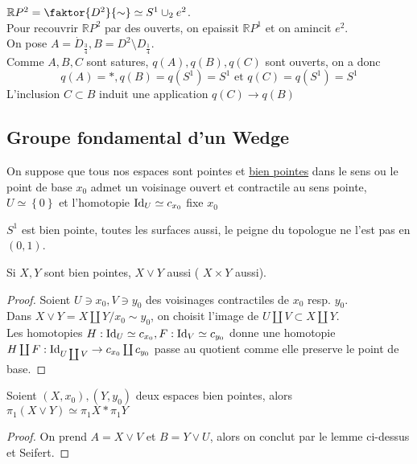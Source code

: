 \documentclass[../main.tex]{subfiles}
\begin{document}
\begin{exemple}
$ \mathbb{R}P^{2} = \faktor { D^{2}} { \sim} \simeq S^{1}\cup_2 e^{2}$.\\
Pour recouvrir $ \mathbb{R}P^{2}$ par des ouverts, on epaissit $ \mathbb{R}P^{1}$ et on amincit $ e^{2}$.\\
On pose $ A =  \dot{ D }_{\frac{3}{4}} , B = D^{2}\setminus D_{\frac{1}{4}} $.\\
Comme $A,B,C$ sont satures, $q( A) ,q( B) , q( C) $ sont ouverts, on a donc
\[ 
q( A) = \ast, q( B) = q( S^{1}) = S^{1} \text{ et } q( C) = q( S^{1}) = S^{1}
\]
L'inclusion $C \subset B$ induit une application $q( C) \to q( B) $ 
\end{exemple}
\subsection{Groupe fondamental d'un Wedge}
On suppose que tous nos espaces sont pointes et \underline {bien pointes} dans le sens ou le point de base $x_0$ admet un voisinage ouvert et contractile au sens pointe, $U \simeq \left\{ 0 \right\} $ et l'homotopie $\operatorname{Id}_U \simeq c_{x_0} $ fixe $x_0$ 
\begin{exemple}
$S^{1}$ est bien pointe, toutes les surfaces aussi, le peigne du topologue ne l'est pas en $ ( 0,1) $.
\end{exemple}
\begin{lemma}
Si $X,Y$ sont bien pointes, $X\vee Y$ aussi ( $X\times Y$ aussi).
\end{lemma}
\begin{proof}
Soient $U\ni x_0, V \ni y_0$ des voisinages contractiles de $x_0$ resp. $y_0$.\\
Dans $X \vee Y= X\coprod Y / x_0\sim y_0$, on choisit l'image de $U \coprod V \subset X\coprod Y$.\\
Les homotopies $H: \operatorname{Id}_U \simeq c_{x_0} , F: \operatorname{Id}_V\simeq c_{y_0} $ donne une homotopie $H\coprod F: \operatorname{Id}_{U\coprod V} \to c_{x_0} \coprod c_{y_0} $ passe au quotient comme elle preserve le point de base.
\end{proof}
\begin{propo}
Soient $ ( X,x_0) , ( Y,y_0) $ deux espaces bien pointes, alors $\pi_1( X\vee Y) \simeq \pi_1X \ast \pi_1 Y$ 
\end{propo}
\begin{proof}
On prend $A= X \vee V$ et $B = Y\vee U$, alors on conclut par le lemme ci-dessus et Seifert.
\end{proof}
\end{document}
